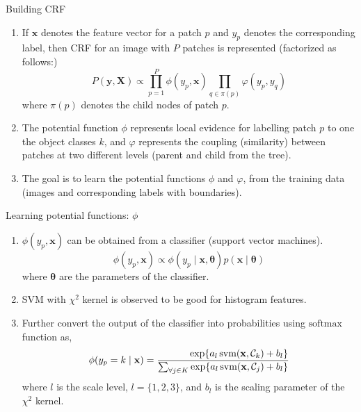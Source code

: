 \documentclass{beamer}
\newcommand{\myfrac}[2]{%
   \setbox0\hbox{$#1$}        %
   \dimen0=\wd0               %
   \setbox1\hbox{$#2$}        %
   \dimen1=\wd1               %
   \ifdim\wd0<\wd1            %
   \dfrac{\hfill#1}{#2}     %
   \else
   \dfrac{#1}{\hfill#2}     %
   \fi
  }
\begin{document}
\begin{frame}{Building CRF}
  \begin{enumerate}
    \item If $\mathbf{x}$ denotes the feature vector for a patch $p$ and $y_p$ denotes the corresponding label, then CRF for an image with $P$ patches is represented (factorized as follows:)
    \begin{equation}
    P( \mathbf{y},  \mathbf{X}) \propto \prod_{p=1}^{P} \phi(y_p, \mathbf{x}) \prod_{q \in \pi(p)}  \varphi (y_p, y_q) 
    \end{equation}
    where $\pi(p)$ denotes the child nodes of patch $p$.  
    \item The potential function $\phi$ represents local evidence for labelling patch $p$ to one the object classes $k$, and $\varphi$ represents the coupling (similarity) between patches at two different levels (parent and child from the tree).
    \item The goal is to learn the potential functions $\phi$ and $\varphi$, from the training data (images and corresponding labels with boundaries).  
  \end{enumerate}  
\end{frame}

\begin{frame}{Learning potential functions: $\phi$}
  \begin{enumerate}
    \item $\phi(y_p, \mathbf{x})$ can be obtained from a classifier (support vector machines).
    \begin{equation}
      \phi(y_p, \mathbf{x}) \propto \phi(y_p \mid \mathbf{x}, \boldsymbol{\theta}) p(\mathbf{x} \mid \boldsymbol{\theta})
    \end{equation}
    where $\boldsymbol{\theta}$ are the parameters of the classifier.
    \item SVM with $\chi^2$ kernel is observed to be good for histogram features.
    \item Further convert the output of the classifier into probabilities using $\textrm{softmax}$ function as,
    \begin{equation}
        \phi(y_p = k \mid \mathbf{x}) = \myfrac{\exp\{a_l \, \textrm{svm}(\mathbf{x}, \mathcal{C}_k) + b_l\}}{\sum_{\forall j \in K} \exp\{a_l \, \textrm{svm}(\mathbf{x}, \mathcal{C}_j) + b_l\}}
    \end{equation}
    where $l$ is the scale level, $l = \{1,2,3\}$, and $b_l$ is the scaling parameter of the $\chi^2$ kernel.
  \end{enumerate}  
\end{frame}
\end{document}
